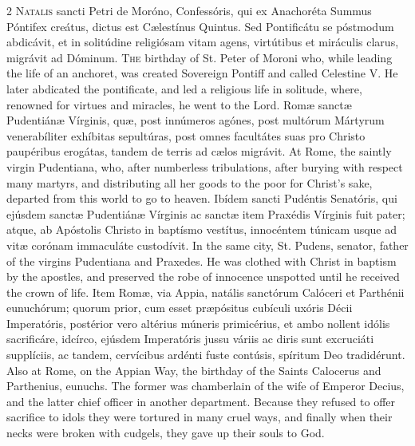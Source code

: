 \begin{paracol}{2}
\lettrine[lines=2]{N}{atalis} sancti Petri 
 de Moróno, Confessóris, qui ex Anachoréta Summus Póntifex creátus, dictus 
 est Cælestínus Quintus. Sed Pontificátu se póstmodum abdicávit, et in 
 solitúdine religiósam vitam agens, virtútibus et miráculis clarus, migrávit 
 ad Dóminum.
\switchcolumn
{}
\lettrine[lines=2]{T}{he} birthday of St. Peter of Moroni 
 who, while leading the life of an anchoret, was created Sovereign Pontiff 
 and called Celestine V. He later abdicated the pontificate, and led a 
 religious life in solitude, where, renowned for virtues and miracles, he 
 went to the Lord.
\switchcolumn*
{}
Romæ sanctæ Pudentiánæ 
 Vírginis, quæ, post innúmeros agónes, post multórum Mártyrum venerabíliter 
 exhíbitas sepultúras, post omnes facultátes suas pro Christo paupéribus 
 erogátas, tandem de terris ad cælos migrávit.
\switchcolumn
{}
At Rome, the saintly virgin 
 Pudentiana, who, after numberless tribulations, after burying with respect 
 many martyrs, and distributing all her goods to the poor for Christ's sake, 
 departed from this world to go to heaven.
\switchcolumn*
{}
Ibídem sancti Pudéntis 
 Senatóris, qui ejúsdem sanctæ Pudentiánæ Vírginis ac sanctæ item Praxédis 
 Vírginis fuit pater; atque, ab Apóstolis Christo in baptísmo vestítus, 
 innocéntem túnicam usque ad vitæ corónam immaculáte custodívit.
\switchcolumn
{}
In the same city, St. Pudens, 
 senator, father of the virgins Pudentiana and Praxedes. He was clothed 
 with Christ in baptism by the apostles, and preserved the robe of innocence 
 unspotted until he received the crown of life.
\switchcolumn*
{}
Item Romæ, via Appia, 
 natális sanctórum Calóceri et Parthénii eunuchórum; quorum prior, cum esset 
 præpósitus cubículi uxóris Décii Imperatóris, postérior vero altérius 
 múneris primicérius, et ambo nollent idólis sacrificáre, idcírco, ejúsdem 
 Imperatóris jussu váriis ac diris sunt excruciáti supplíciis, ac tandem, 
 cervícibus ardénti fuste contúsis, spíritum Deo tradidérunt.
\switchcolumn
{}
Also at Rome, on the Appian Way, 
 the birthday of the Saints Calocerus and Parthenius, eunuchs. The 
 former was chamberlain of the wife of Emperor Decius, and the latter chief 
 officer in another department. Because they refused to offer sacrifice 
 to idols they were tortured in many cruel ways, and finally when their necks 
 were broken with cudgels, they gave up their souls to God.

\end{paracol}
